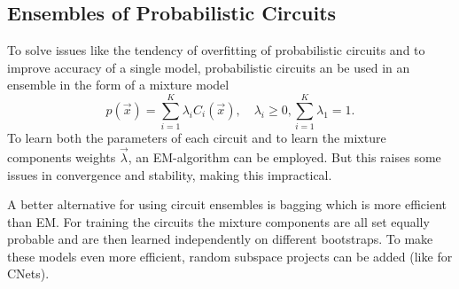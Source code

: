 
		\subsection{Ensembles of Probabilistic Circuits}
			To solve issues like the tendency of overfitting of probabilistic circuits and to improve accuracy of a single model, probabilistic circuits an be used in an ensemble in the form of a mixture model
			\begin{equation}
				p(\vec{x}) = \sum_{i = 1}^{K} \lambda_i C_i(\vec{x}),\quad \lambda_i \geq 0, \sum_{i = 1}^{K} \lambda_1 = 1.
			\end{equation}
			To learn both the parameters of each circuit and to learn the mixture components weights \(\vec{\lambda}\), an EM-algorithm can be employed. But this raises some issues in convergence and stability, making this impractical.

			A better alternative for using circuit ensembles is bagging which is more efficient than EM. For training the circuits the mixture components are all set equally probable and are then learned independently on different bootstraps. To make these models even more efficient, random subspace projects can be added (like for CNets).

